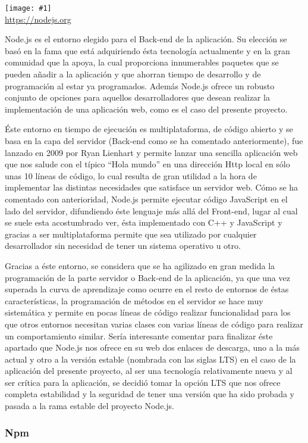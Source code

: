\documentclass[11pt,openany]{book}
\newcommand{\logo}[2]{\medskip\begin{center}\texttt{[image: \#1]}\\\scriptsize\url{#2}\end{center}\bigskip}
\begin{document}
\logo{logos/nodejs.png}{https://nodejs.org}

Node.js es el entorno elegido para el Back-end de la aplicación. Su elección se basó en la fama que está adquiriendo ésta tecnología actualmente y en la gran comunidad que la apoya, la cual proporciona innumerables paquetes que se pueden añadir a la aplicación y que ahorran tiempo de desarrollo y de programación al estar ya programados. Además Node.js ofrece un robusto conjunto de opciones para aquellos desarrolladores que desean realizar la implementación de una aplicación web, como es el caso del presente proyecto.

Éste entorno en tiempo de ejecución es multiplataforma, de código abierto y se basa en la capa del servidor (Back-end como se ha comentado anteriormente), fue lanzado en 2009 por Ryan Lienhart\cite{4} y permite lanzar una sencilla aplicación web que nos salude con el típico ``Hola mundo'' en una dirección Http local en sólo unas 10 líneas de código, lo cual resulta de gran utilidad a la hora de implementar las distintas necesidades que satisface un servidor web. Cómo se ha comentado con anterioridad, Node.js permite ejecutar código JavaScript en el lado del servidor, difundiendo éste lenguaje más allá del Front-end, lugar al cual se suele esta acostumbrado ver, ésta implementado con C++ y JavaScript y gracias a ser multiplataforma permite que sea utilizado por cualquier desarrollador sin necesidad de tener un sistema operativo u otro.

Gracias a éste entorno, se considera que se ha agilizado en gran medida la programación de la parte servidor o Back-end de la aplicación, ya que una vez superada la curva de aprendizaje como ocurre en el resto de entornos de éstas características, la programación de métodos en el servidor se hace muy sistemática y permite en pocas líneas de código realizar funcionalidad para los que otros entornos necesitan varias clases con varias líneas de código para realizar un comportamiento similar. Sería interesante comentar para finalizar éste apartado que Node.js nos ofrece en su web dos enlaces de descarga, uno a la más actual y otro a la versión estable (nombrada con las siglas LTS) en el caso de la aplicación del presente proyecto, al ser una tecnología relativamente nueva y al ser crítica para la aplicación, se decidió tomar la opción LTS que nos ofrece completa estabilidad y la seguridad de tener una versión que ha sido probada y pasada a la rama estable del proyecto Node.js.

\subsubsection{Npm}
\end{document}
